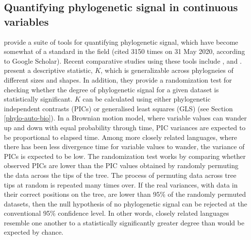 \hypertarget{phylo-sig-quant}{%
\subsection{Quantifying phylogenetic signal in continuous variables}\label{phylo-sig-quant}}

\textcite{blomberg_testing_2003} provide a suite of tools for quantifying phylogenetic signal, which have become somewhat of a standard in the field (cited 3150 times on 31 May 2020, according to Google Scholar). Recent comparative studies using these tools include \textcite{balisi_dietary_2018}, \textcite{hutchinson_contemporary_2018} and \textcite{leff_predicting_2018}. \textcite{blomberg_testing_2003} present a descriptive statistic, \(K\), which is generalizable across phylogneies of different sizes and shapes. In addition, they provide a randomization test for checking whether the degree of phylogenetic signal for a given dataset is statistically significant. \(K\) can be calculated using either phylogenetic independent contrasts (PICs) \autocite{felsenstein_phylogenies_1985} or generalised least squares (GLS) \autocite{grafen_phylogenetic_1989} (see Section \ref{phylo-auto-bio}). In a Brownian motion model, where variable values can wander up and down with equal probability through time, PIC variances are expected to be proportional to elapsed time. Among more closely related languages, where there has been less divergence time for variable values to wander, the variance of PICs is expected to be low. The randomization test works by comparing whether observed PICs are lower than the PIC values obtained by randomly permuting the data across the tips of the tree. The process of permuting data across tree tips at random is repeated many times over. If the real variances, with data in their correct positions on the tree, are lower than 95\% of the randomly permuted datasets, then the null hypothesis of no phylogenetic signal can be rejected at the conventional 95\% confidence level. In other words, closely related languages resemble one another to a statistically significantly greater degree than would be expected by chance.

